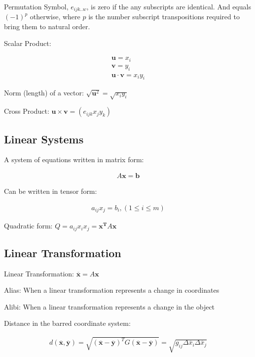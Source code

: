 \documentclass{article}
\begin{document}
\noindent
Permutation Symbol, $e_{ijk..w}$, is zero if the any subscripts are identical. And equals $(-1)^p$ otherwise, where $p$ is the number subscript transpositions required to bring them to natural order.

\noindent
Scalar Product:

\begin{align*}
	\mathbf{ u } = x_i\\
	\mathbf{ v } = y_i\\
	\mathbf{ u } \cdot \mathbf{ v } = x_i y_i
\end{align*}

\noindent
Norm (length) of a vector: $\sqrt{ \mathbf{ u }^2 } = \sqrt{ x_i y_i }$

\noindent
Cross Product: $\mathbf{ u } \times \mathbf{ v } = ( e_{ijk} x_j y_k )$

\subsection{Linear Systems}

A system of equations written in matrix form:

\begin{align}
	A \mathbf{ x } = \mathbf{ b }
\end{align}

Can be written in tensor form:

\begin{align}
	a_{ij} x_j = b_i, (1 \leq i \leq m)
\end{align}

\noindent
Quadratic form: $Q = a_{ij} x_i x_j = \mathbf{ x^T } A \mathbf{ x }$

\subsection{Linear Transformation}

\noindent
Linear Transformation: $\mathbf{ \overline{ x } } = A \mathbf{ x }$

\noindent
Alias: When a linear transformation represents a change in coordinates

\noindent
Alibi: When a linear transformation represents a change in the object

Distance in the barred coordinate system:

\begin{align}
	d( \mathbf{ \overline{ x } }, \mathbf{ \overline{ y } } ) = \sqrt{ ( \mathbf{ \overline{ x } } - \mathbf{ \overline{ y } } )^T G( \mathbf{ \overline{ x } } - \mathbf{ \overline{ y } } ) } = \sqrt{ g_{ij} \Delta \overline{ x }_i \Delta \overline{ x }_j }
\end{align}
\end{document}
